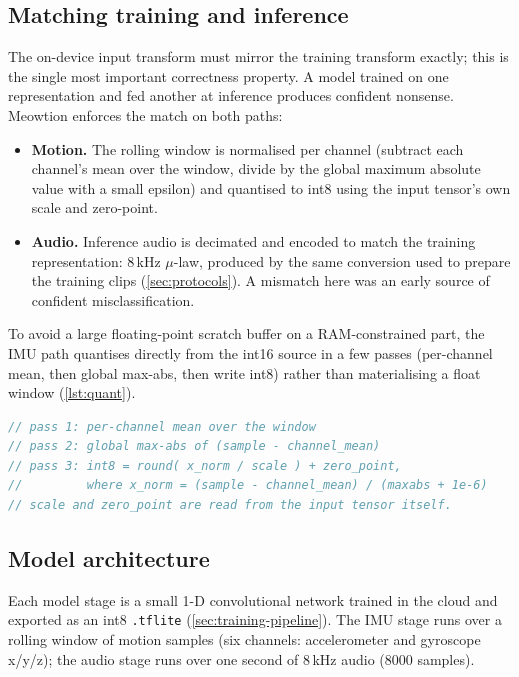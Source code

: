 \subsection{Matching training and inference}

The on-device input transform must mirror the training transform exactly; this is the single most
important correctness property. A model trained on one representation and fed another at inference
produces confident nonsense. Meowtion enforces the match on both paths:

\begin{itemize}[leftmargin=1.5em]
  \item \textbf{Motion.} The rolling window is normalised per channel (subtract each channel's mean
        over the window, divide by the global maximum absolute value with a small epsilon) and
        quantised to int8 using the input tensor's own scale and zero-point.
  \item \textbf{Audio.} Inference audio is decimated and encoded to match the training
        representation: 8\,kHz $\mu$-law, produced by the same conversion used to prepare the training
        clips (\cref{sec:protocols}). A mismatch here was an early source of confident
        misclassification.
\end{itemize}

To avoid a large floating-point scratch buffer on a RAM-constrained part, the IMU path quantises
directly from the int16 source in a few passes (per-channel mean, then global max-abs, then write
int8) rather than materialising a float window (\cref{lst:quant}).

\begin{lstlisting}[language=C,caption={Direct int16-to-int8 quantisation, mirroring training (sketch).},label={lst:quant}]
// pass 1: per-channel mean over the window
// pass 2: global max-abs of (sample - channel_mean)
// pass 3: int8 = round( x_norm / scale ) + zero_point,
//         where x_norm = (sample - channel_mean) / (maxabs + 1e-6)
// scale and zero_point are read from the input tensor itself.
\end{lstlisting}

\subsection{Model architecture}

Each model stage is a small 1-D convolutional network trained in the cloud and exported as an int8
\texttt{.tflite} (\cref{sec:training-pipeline}). The IMU stage runs over a rolling window of motion
samples (six channels: accelerometer and gyroscope x/y/z); the audio stage runs over one second of
8\,kHz audio (8000 samples).

